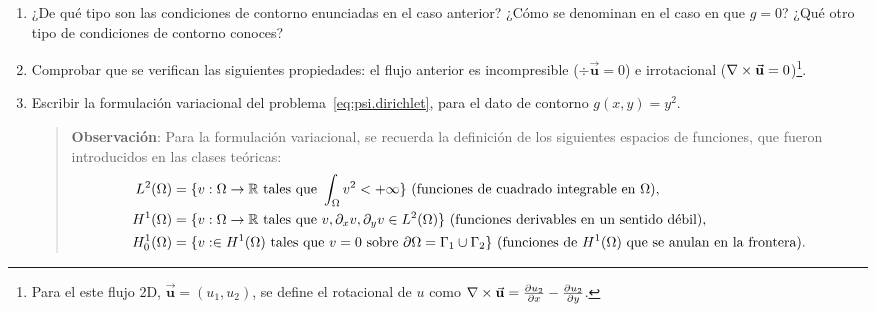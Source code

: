 \documentclass[11pt]{article}
\newcommand{\Vector}[1]{\ensuremath{\vec{\mathbf{#1}}}}
\renewcommand{\uu}{\Vector{u}}
\newcommand{\rot}{\grad\times}
\begin{document}
\begin{enumerate}

\item ¿De qué tipo son las condiciones de contorno enunciadas en el
caso anterior? ¿Cómo se denominan en el caso en que $g=0$? ¿Qué otro
tipo de condiciones de contorno conoces?
\item Comprobar que se verifican las siguientes propiedades: el flujo anterior es
incompresible ($\div\uu=0$) e irrotacional
($\rot\uu=0$)\footnote{Para el este flujo 2D, $\uu=(u_1,u_2)$, se
define el rotacional de $u$ como
$\rot\uu=\frac{\partial u_2}{\partial x} - \frac{\partial
    u_2}{\partial y}$.}.


\item Escribir la formulación variacional del
problema~\eqref{eq:psi.dirichlet}, para el dato de contorno
$g(x,y)=y^2$.
\begin{quotation}
\begin{footnotesize}
\begin{emph}
\textbf{Observación}: Para la formulación variacional, se recuerda la definición de los siguientes
espacios de funciones, que fueron introducidos en las clases
teóricas:
\begin{align*}
L^2(\Omega)&=\{ v:\Omega\to{\mathbb R}\ \text{tales que}\ \int_\Omega v^2 < +\infty\}
                \ \text{(funciones de cuadrado integrable en $\Omega$)},
\\
H^1(\Omega)&=\{ v:\Omega\to{\mathbb R}\ \text{tales que}\ v, \partial_x v, \partial_y v \in L^2(\Omega) \}
                \ \text{(funciones derivables en un sentido débil)},
\\
H^1_0(\Omega)&=\{ v:\in H^1(\Omega) \ \text{tales que}\ v=0 \text { sobre } \partial\Omega=\Gamma_1\cup\Gamma_2\}
                \ \text{(funciones de $H^1(\Omega)$ que se anulan en la frontera)}.
\end{align*}
\end{emph}
\end{footnotesize}
\end{quotation}
\vspace{-2em}



\end{enumerate}
\end{document}
